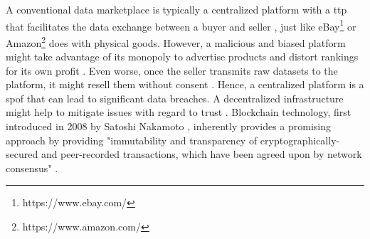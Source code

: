 A conventional data marketplace is typically a centralized platform with a \acrfull{ttp} that facilitates the data exchange between a buyer and seller \cite{daiSDTESecureBlockchainBased2020}, just like eBay\footnote{https://www.ebay.com/} or Amazon\footnote{https://www.amazon.com/} does with physical goods. However, a malicious and biased platform might take advantage of its monopoly to advertise products and distort rankings for its own profit \cite{ramachandranDecentralizedDataMarketplace2018}. Even worse, once the seller transmits raw datasets to the platform, it might resell them without consent \cite{suBDTFBlockchainBasedData2020,serranoPeertoPeerOwnershipPreservingData2021,daiSDTESecureBlockchainBased2020,banerjeeBlockchainEnabledData2019}. Hence, a centralized platform is a \acrfull{spof} that can lead to significant data breaches. A decentralized infrastructure might help to mitigate issues with regard to trust \cite{ramachandranDecentralizedDataMarketplace2018}. Blockchain technology, first introduced in 2008 by Satoshi Nakamoto \cite{nakamotoBitcoinPeertoPeerElectronic}, inherently provides a promising approach by providing "immutability and transparency of cryptographically-secured and peer-recorded transactions, which have been agreed upon by network consensus" \cite{eberhardtBlockchainInsightsOffChaining2017}.



